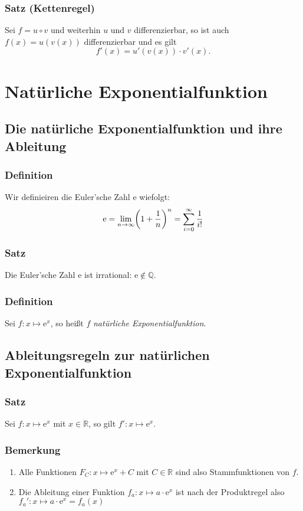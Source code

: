 \documentclass[a4paper,12pt]{article}
\newcommand{\Q}{\mathbb{Q}}
\newcommand{\R}{\mathbb{R}}
\newcommand{\e}{\mathrm{e}}
\begin{document}
\subsubsection{Satz (Kettenregel)}
Sei $f =u \circ v$ und weiterhin $u$ und $v$ differenzierbar, so ist auch $f(x)= u(v(x))$ differenzierbar und es gilt
\[ f'(x)=u'(v(x)) \cdot v'(x) \text{.}\]

\newpage
\section{Natürliche Exponentialfunktion}
\subsection{Die natürliche Exponentialfunktion und ihre Ableitung}

\subsubsection{Definition}
Wir definieiren die Euler'sche Zahl $\e$ wiefolgt:
\[ \e = \lim \limits_{n \rightarrow \infty}  \mleft( 1+\frac{1}{n} \mright) ^n = \sum\limits_{i=0}^{\infty} \dfrac{1}{i!}\]

\subsubsection{Satz}
Die Euler'sche Zahl $\e$ ist irrational: $\e\notin \Q$. 

\subsubsection{Definition}
Sei $f:x\mapsto \e^x$, so heißt $f$ \emph{natürliche Exponentialfunktion}.

\subsection{Ableitungsregeln zur natürlichen Exponentialfunktion}

\subsubsection{Satz}
Sei $f:x\mapsto \e^x$ mit $x\in\R$, so gilt $f':x\mapsto \e^x$.

\subsubsection{Bemerkung}
\begin{enumerate}[(1)]
\item Alle Funktionen $F_C : x \mapsto \e^x+C$ mit $C\in\R$ sind also Stammfunktionen von $f$.
\item Die Ableitung einer Funktion $f_a :x \mapsto a \cdot \e^x$ ist nach der Produktregel also $f_a':x\mapsto a \cdot \e^x = f_a(x)$
\end{enumerate}
\end{document}

